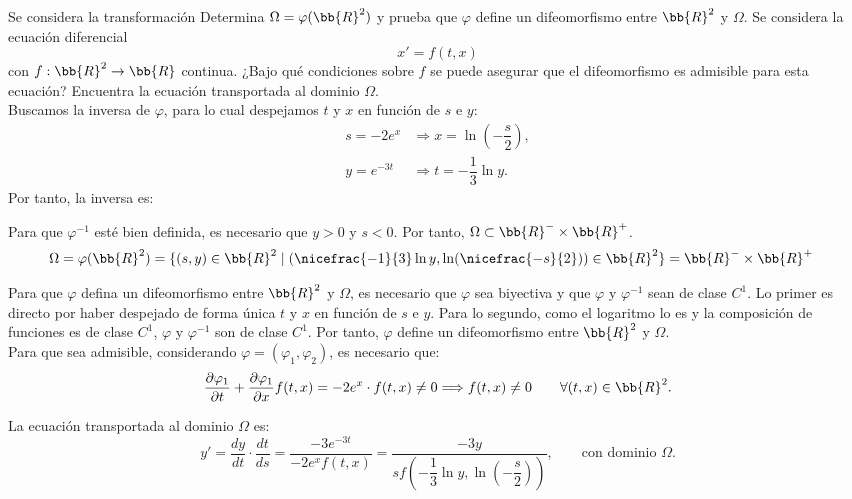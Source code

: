 \documentclass[12pt]{article}
\begin{document}
\begin{ejercicio}
    Se considera la transformación
    Determina $\Omega=\varphi(\bb{R}^2)$ y prueba que $\varphi$ define un difeomorfismo entre $\bb{R}^2$ y $\Omega$.
    Se considera la ecuación diferencial
    \begin{equation*}
        x'=f(t,x)
    \end{equation*}
    con $f:\bb{R}^2\to\bb{R}$ continua. ¿Bajo qué condiciones sobre $f$ se puede asegurar que el difeomorfismo es admisible para esta ecuación? Encuentra la ecuación transportada al dominio $\Omega$.\\

    Buscamos la inversa de $\varphi$, para lo cual despejamos $t$ y $x$ en función de $s$ e $y$:
    \begin{align*}
        s=-2e^x &\Longrightarrow x=\ln\left(-\dfrac{s}{2}\right),\\
        y=e^{-3t} &\Longrightarrow t=-\dfrac{1}{3}\ln y.
    \end{align*}
    Por tanto, la inversa es:

    Para que $\varphi^{-1}$ esté bien definida, es necesario que $y>0$ y $s<0$. Por tanto, $\Omega\subset \bb{R}^- \times \bb{R}^+$.
    \begin{align*}
        \Omega &= \varphi(\bb{R}^2)=\{(s,y)\in \bb{R}^2\mid (\nicefrac{-1}{3}\ln y,\ln(\nicefrac{-s}{2}))\in \bb{R}^2\}=\bb{R}^-\times \bb{R}^+
    \end{align*}

    Para que $\varphi$ defina un difeomorfismo entre $\bb{R}^2$ y $\Omega$, es necesario que $\varphi$ sea biyectiva y que $\varphi$ y $\varphi^{-1}$ sean de clase $C^1$. Lo primer es directo por haber despejado de forma única $t$ y $x$ en función de $s$ e $y$. Para lo segundo, como el logaritmo lo es y la composición de funciones es de clase $C^1$, $\varphi$ y $\varphi^{-1}$ son de clase $C^1$. Por tanto, $\varphi$ define un difeomorfismo entre $\bb{R}^2$ y $\Omega$.\\

    Para que sea admisible, considerando $\varphi=(\varphi_1,\varphi_2)$, es necesario que:
    \begin{equation*}
        \dfrac{\partial \varphi_1}{\partial t} + \dfrac{\partial \varphi_1}{\partial x}f(t,x)
        = -2e^x\cdot f(t,x) \neq 0 \Longrightarrow f(t,x)\neq 0\qquad \forall (t,x)\in\bb{R}^2.
    \end{equation*}

    La ecuación transportada al dominio $\Omega$ es:
    \begin{equation*}
        y'=\dfrac{dy}{dt}\cdot \dfrac{dt}{ds}=\dfrac{-3e^{-3t}}{-2e^x f(t,x)}=\dfrac{-3y}{sf\left(-\dfrac{1}{3}\ln y,\ln\left(-\dfrac{s}{2}\right)\right)},\qquad \text{con dominio }\Omega.
    \end{equation*}
\end{ejercicio}
\end{document}
